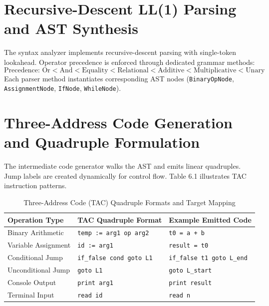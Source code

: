 \documentclass[12pt,a4paper]{report}
\begin{document}
\section{Recursive-Descent LL(1) Parsing and AST Synthesis}
The syntax analyzer implements recursive-descent parsing with single-token lookahead. Operator precedence is enforced through dedicated grammar methods:
\begin{equation}
    \text{Precedence: } \text{Or} < \text{And} < \text{Equality} < \text{Relational} < \text{Additive} < \text{Multiplicative} < \text{Unary}
\end{equation}
Each parser method instantiates corresponding AST nodes (\texttt{BinaryOpNode}, \texttt{AssignmentNode}, \texttt{IfNode}, \texttt{WhileNode}).

\section{Three-Address Code Generation and Quadruple Formulation}
The intermediate code generator walks the AST and emits linear quadruples. Jump labels are created dynamically for control flow. Table 6.1 illustrates TAC instruction patterns.

\begin{table}[htbp]
    \centering
    \caption{Three-Address Code (TAC) Quadruple Formats and Target Mapping}
    \label{tab:tac_formats}
    \vspace{0.2cm}
    \begin{tabularx}{\textwidth}{llX}
        \toprule
        \textbf{Operation Type} & \textbf{TAC Quadruple Format} & \textbf{Example Emitted Code} \\
        \midrule
        Binary Arithmetic & \texttt{temp := arg1 op arg2} & \texttt{t0 = a + b} \\
        Variable Assignment & \texttt{id := arg1} & \texttt{result = t0} \\
        Conditional Jump & \texttt{if\_false cond goto L1} & \texttt{if\_false t1 goto L\_end} \\
        Unconditional Jump & \texttt{goto L1} & \texttt{goto L\_start} \\
        Console Output & \texttt{print arg1} & \texttt{print result} \\
        Terminal Input & \texttt{read id} & \texttt{read n} \\
        \bottomrule
    \end{tabularx}
\end{table}
\end{document}
